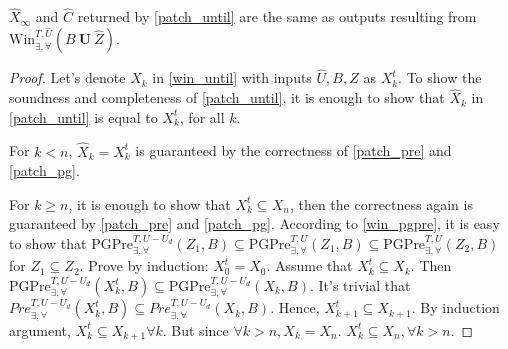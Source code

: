 \begin{theorem}
	$ \widehat{X}_\infty $ and $ \widehat{C} $ returned by \eqref{patch_until} are the same as outputs resulting from $ \text{Win}_{\exists,\forall}^{T,\widehat{U}}(B\mathbf{\ U\ }\widehat{Z}). $\label{thm:until}	
\end{theorem}

\begin{proof}
	Let's denote $ X_k $ in \eqref{win_until} with inputs $ \widehat{U},B,\widehat{Z} $ as $ X_k^t $. 	To show the soundness and completeness of \eqref{patch_until}, it is enough to show that $ \widehat{X}_k $ in \eqref{patch_until} is equal to $ X_k^t $, for all $ k $. 
	
	For $ k< n $, $ \widehat{X}_k = X_k^t $ is guaranteed by the correctness of \eqref{patch_pre} and \eqref{patch_pg}. 
	
	For $ k\geq n $, it is enough to show that $ X^t_k \subseteq X_n $, then the correctness again is guaranteed by \eqref{patch_pre} and \eqref{patch_pg}. According to \eqref{win_pgpre}, it is easy to show that $ \text{PGPre}_{\exists,\forall}^{T,U-U_d}(Z_1,B)\subseteq \text{PGPre}_{\exists,\forall}^{T,U}(Z_1,B)\subseteq \text{PGPre}_{\exists,\forall}^{T,U}(Z_2,B) $ for $ Z_1\subseteq Z_2 $. Prove by induction:  $ X_0^t = X_0 $. Assume that $ X_k^t \subseteq X_k $. Then $ \text{PGPre}^{T,U-U_d}_{\exists,\forall}(X^t_{k},B) \subseteq \text{PGPre}^{T,U-U_d}_{\exists,\forall}(X_{k},B)$. It's trivial that $ Pre^{T,U-U_d}_{\exists,\forall}(X^t_{k},B) \subseteq Pre^{T,U-U_d}_{\exists,\forall}(X_{k},B)$. Hence, $ X^t_{k+1}\subseteq X_{k+1} $. By induction argument, $ X_{k}^t\subseteq X_{k+1} \forall k$. But since $ \forall k>n, X_k=X_n $. $ X^t_k \subseteq X_n, \forall k>n $.
\end{proof}

